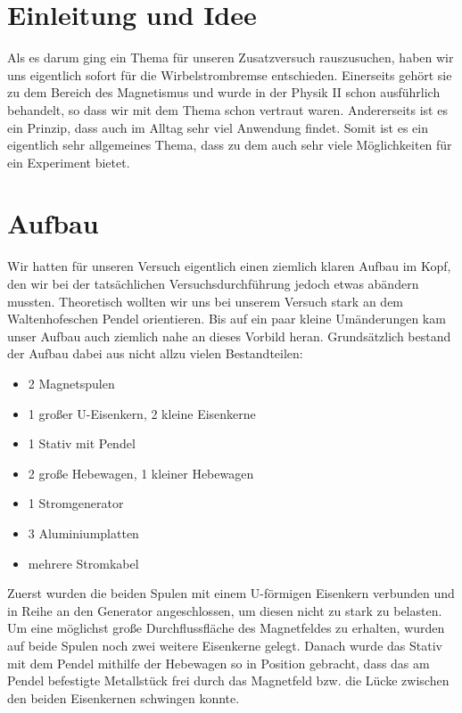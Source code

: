 



\section{Einleitung und Idee}

Als es darum ging ein Thema für unseren Zusatzversuch rauszusuchen, haben wir uns
eigentlich sofort für die Wirbelstrombremse entschieden. Einerseits gehört sie zu
dem Bereich des Magnetismus und wurde in der Physik II schon ausführlich behandelt,
so dass wir mit dem Thema schon vertraut waren. Andererseits ist es ein Prinzip,
dass auch im Alltag sehr viel Anwendung findet. Somit ist es ein eigentlich sehr
allgemeines Thema, dass zu dem auch sehr viele Möglichkeiten für ein Experiment
bietet.

\section{Aufbau}

Wir hatten für unseren Versuch eigentlich einen ziemlich klaren Aufbau im Kopf,
den wir bei der tatsächlichen Versuchsdurchführung jedoch etwas abändern mussten.
Theoretisch wollten wir uns bei unserem Versuch stark an dem Waltenhofeschen Pendel
orientieren. Bis auf ein paar kleine Umänderungen kam unser Aufbau auch ziemlich
nahe an dieses Vorbild heran. Grundsätzlich bestand der Aufbau dabei aus nicht
allzu vielen Bestandteilen:

\begin{itemize}
  \item 2 Magnetspulen
  \item 1 großer U-Eisenkern, 2 kleine Eisenkerne
  \item 1 Stativ mit Pendel
  \item 2 große Hebewagen, 1 kleiner Hebewagen
  \item 1 Stromgenerator
  \item 3 Aluminiumplatten
  \item mehrere Stromkabel
\end{itemize}

Zuerst wurden die beiden Spulen mit einem U-förmigen Eisenkern verbunden und in
Reihe an den Generator angeschlossen, um diesen nicht zu stark zu belasten. Um
eine möglichst große Durchflussfläche des Magnetfeldes zu erhalten, wurden auf
beide Spulen noch zwei weitere Eisenkerne gelegt. Danach wurde das Stativ mit dem
Pendel mithilfe der Hebewagen so in Position gebracht, dass das am Pendel befestigte
Metallstück frei durch das Magnetfeld bzw. die Lücke zwischen den beiden Eisenkernen
schwingen konnte.

